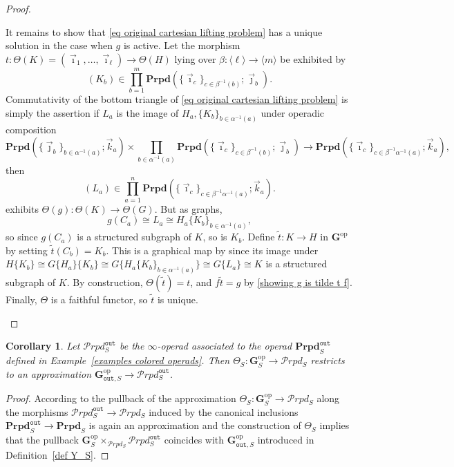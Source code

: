 \documentclass{amsart}
\numberwithin{theorem}{subsection}
\newtheorem{corollary}[theorem]{Corollary}
\theoremstyle{definition}
\providecommand{\op}{\mathrm{op}}
\newcommand{\bbY}{\mathbf{G}}
\newcommand{\out}{\mathtt{out}}
\newcommand{\calproperad}{\mathcal{P}rpd}
\newcommand{\bfproperad}{\mathbf{Prpd}}
\newcommand{\nsqelt}[1]{\vec{#1}}
\begin{document}
\begin{proof}
\begin{enumerate}
It remains to show that \eqref{eq original cartesian lifting problem} has a unique solution in the case when $g$ is active.
Let the morphism $t \colon \Theta(K) = (\nsqelt{\imath}_1, \dots, \nsqelt{\imath}_\ell) \to \Theta(H)$ lying over $\beta \colon  \langle \ell \rangle \to \langle m \rangle$
be exhibited by
\[
	(K_b) \in \prod_{b=1}^m \bfproperad(\{ \nsqelt{\imath}_c\}_{c \in \beta^{-1}(b)}; \nsqelt{\jmath}_b).
\]
Commutativity of the bottom triangle of \eqref{eq original cartesian lifting problem} is simply the assertion if $L_a$ is the image of $H_a, \{K_b\}_{b\in \alpha^{-1}(a)}$ under operadic composition
\[
	\bfproperad(\{ \nsqelt{\jmath}_b\}_{b \in \alpha^{-1}(a)}; \nsqelt{k}_a) \times \prod_{b\in \alpha^{-1}(a)} \bfproperad(\{ \nsqelt{\imath}_c\}_{c \in \beta^{-1}(b)}; \nsqelt{\jmath}_b) \to \bfproperad( \{ \nsqelt{\imath}_c\}_{c \in \beta^{-1}\alpha^{-1}(a)}; \nsqelt{k}_a),
\]
then 
\[
	(L_a) \in \prod_{a=1}^n \bfproperad( \{ \nsqelt{\imath}_c\}_{c \in \beta^{-1}\alpha^{-1}(a)}; \nsqelt{k}_a).
\]
exhibits $\Theta(g) \colon \Theta(K) \to \Theta(G)$.
But as graphs, 
\begin{equation}\label{showing g is tilde t f}
g(C_a) \cong L_a \cong H_a\{K_b\}_{b\in \alpha^{-1}(a)},
\end{equation} so since $g(C_a)$ is a structured subgraph of $K$, so is $K_b$.
Define $\tilde t \colon K \to H$ in $\bbY^\op$ by setting $\tilde t (C_b)  = K_b$.
This is a graphical map by \cite[Theorem 6.50]{hrybook} since its image under $H\{K_b\} \cong G\{H_a\} \{K_b\} \cong G \{ H_a \{ K_b\}_{b\in \alpha^{-1}(a)} \} \cong G\{ L_a \} \cong K$ is a structured subgraph of $K$.
By construction, $\Theta(\tilde t) = t$, and $f \tilde t = g$ by \eqref{showing g is tilde t f}.
Finally, $\Theta$ is a faithful functor, so $\tilde t$ is unique. \qedhere
\end{enumerate}
\end{proof}
\begin{corollary}\label{cor on other subcategories and theta}
	Let $\calproperad^{\out}_S$ be the $\infty$-operad associated to the operad $\bfproperad^{\out}_S$ defined in Example~\ref{examples colored operads}. Then $\Theta_S\colon \bbY^\op_S\to  \calproperad_{S}$ restricts to an approximation $\bbY^{\op}_{\out,S}\to \calproperad^{\out}_S$.
\end{corollary}
\begin{proof}
	According to \cite[Remark 2.3.3.9]{ha} the pullback of the approximation $\Theta_S\colon \bbY^\op_S\to  \calproperad_{S}$ along the morphisms $\calproperad^{\out}_S\to \calproperad_S$ induced by the canonical inclusions $\bfproperad^{\out}_S\to \bfproperad_S$ is again an approximation and the construction of $\Theta_S$ implies that the pullback $\bbY^\op_S\times_{\calproperad_{S}}\calproperad^{\out}_S$ coincides with $\bbY^{\op}_{\out,S}$ introduced in Definition~\ref{def Y_S}.
\end{proof}
\end{document}
